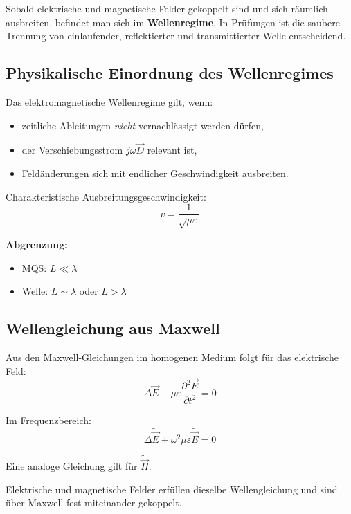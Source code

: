 \documentclass[a4paper]{article}
\newcommand{\imp}[1]{{\color{accent}\bfseries #1}}
\newcommand{\E}{\vec E}
\newcommand{\D}{\vec D}
\newcommand{\Hf}{\vec H}
\newcommand{\eps}{\varepsilon}
\begin{document}
\begin{merke}
Sobald elektrische und magnetische Felder gekoppelt sind und sich räumlich ausbreiten,
befindet man sich im \imp{Wellenregime}.
In Prüfungen ist die saubere Trennung von einlaufender, reflektierter und transmittierter Welle entscheidend.
\end{merke}

\subsection{Physikalische Einordnung des Wellenregimes}

Das elektromagnetische Wellenregime gilt, wenn:
\begin{itemize}
  \item zeitliche Ableitungen \emph{nicht} vernachlässigt werden dürfen,
  \item der Verschiebungsstrom $j\omega\D$ relevant ist,
  \item Feldänderungen sich mit endlicher Geschwindigkeit ausbreiten.
\end{itemize}

Charakteristische Ausbreitungsgeschwindigkeit:
\[
v = \frac{1}{\sqrt{\mu\eps}}
\]

\begin{schema}
\imp{Abgrenzung:}
\begin{itemize}
  \item MQS: $L \ll \lambda$
  \item Welle: $L \sim \lambda$ oder $L > \lambda$
\end{itemize}
\end{schema}

\subsection{Wellengleichung aus Maxwell}

Aus den Maxwell-Gleichungen im homogenen Medium folgt für das elektrische Feld:
\[
\Delta \E - \mu\eps \frac{\partial^2 \E}{\partial t^2} = 0
\]

Im Frequenzbereich:
\[
\Delta \tilde{\E} + \omega^2 \mu\eps \tilde{\E} = 0
\]

Eine analoge Gleichung gilt für $\tilde{\Hf}$.

\begin{merke}
Elektrische und magnetische Felder erfüllen dieselbe Wellengleichung
und sind über Maxwell fest miteinander gekoppelt.
\end{merke}
\end{document}
